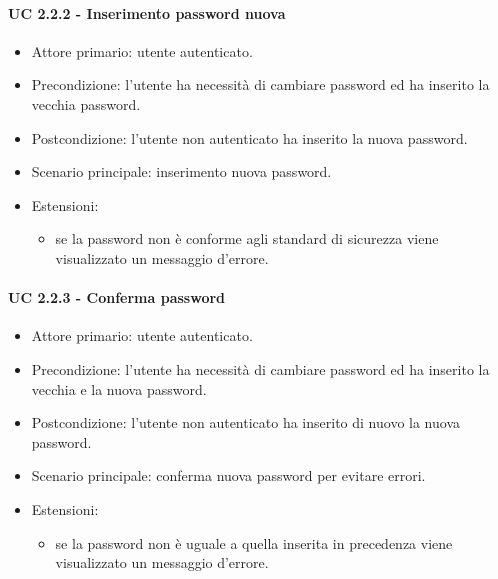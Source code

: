         \paragraph{UC 2.2.2 - Inserimento password nuova}
            \begin{itemize}
                \item Attore primario: utente autenticato.
                \item Precondizione: l'utente ha necessità di cambiare password ed ha inserito la vecchia password.
                \item Postcondizione: l'utente non autenticato ha inserito la nuova password.
                \item Scenario principale: inserimento nuova password.
                \item Estensioni:
                    \begin{itemize}
                        \item se la password non è conforme agli standard di sicurezza viene visualizzato un messaggio d'errore.
                    \end{itemize}
            \end{itemize}
        \paragraph{UC 2.2.3 - Conferma password}
            \begin{itemize}
                \item Attore primario: utente autenticato.
                \item Precondizione: l'utente ha necessità di cambiare password ed ha inserito la vecchia e la nuova password.
                \item Postcondizione: l'utente non autenticato ha inserito di nuovo la nuova password.
                \item Scenario principale: conferma nuova password per evitare errori.
                \item Estensioni:
                    \begin{itemize}
                        \item se la password non è uguale a quella inserita in precedenza viene visualizzato un messaggio d'errore.
                    \end{itemize}
            \end{itemize}
